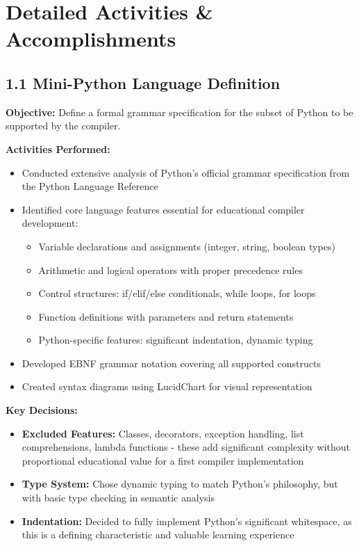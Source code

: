 \documentclass[a4paper,11pt]{article}
\begin{document}
\section{Detailed Activities \& Accomplishments}

\subsection{1.1 Mini-Python Language Definition}

\textbf{Objective:} Define a formal grammar specification for the subset of Python to be supported by the compiler.

\textbf{Activities Performed:}
\begin{itemize}[leftmargin=*]
    \item Conducted extensive analysis of Python's official grammar specification from the Python Language Reference
    \item Identified core language features essential for educational compiler development:
    \begin{itemize}
        \item Variable declarations and assignments (integer, string, boolean types)
        \item Arithmetic and logical operators with proper precedence rules
        \item Control structures: if/elif/else conditionals, while loops, for loops
        \item Function definitions with parameters and return statements
        \item Python-specific features: significant indentation, dynamic typing
    \end{itemize}
    \item Developed EBNF grammar notation covering all supported constructs
    \item Created syntax diagrams using LucidChart for visual representation
\end{itemize}

\textbf{Key Decisions:}
\begin{itemize}[leftmargin=*]
    \item \textbf{Excluded Features:} Classes, decorators, exception handling, list comprehensions, lambda functions - these add significant complexity without proportional educational value for a first compiler implementation
    \item \textbf{Type System:} Chose dynamic typing to match Python's philosophy, but with basic type checking in semantic analysis
    \item \textbf{Indentation:} Decided to fully implement Python's significant whitespace, as this is a defining characteristic and valuable learning experience
\end{itemize}
\end{document}
